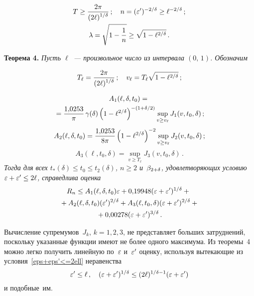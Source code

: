 \begin{multicols}{2}
\noindent
\begin{gather*}
T\ge \displaystyle\frac{\displaystyle 2\pi\mathstrut}{\displaystyle (2\ell)^{1/\delta}\mathstrut}\,;\quad n=(\varepsilon')^{-2/\delta}\ge
\ell^{-2/\delta}\,;\\
\lambda=\sqrt{1-\displaystyle\frac{\displaystyle 1\mathstrut}{\displaystyle n\mathstrut}}\ge\sqrt{1-\ell^{2/\delta}}\,.
\end{gather*}

\smallskip

\noindent
\textbf{Теорема 4.}
\textit{Пусть $\ell$~--- произвольное число из интервала $(0,\,1)$. Обозначим}

\noindent
$$
T_\ell=\displaystyle\frac{\displaystyle 2\pi\mathstrut}{\displaystyle (2\ell)^{1/\delta}\mathstrut}\,;\quad
v_\ell=T_\ell\sqrt{1-\ell^{2/\delta}}\,;
$$

\vspace*{-12pt}

\noindent
\begin{multline*}
A_1(\ell,\delta,t_0)={}\\
{}=
\displaystyle\frac{\displaystyle 1{,}0253\mathstrut}{\displaystyle \pi\mathstrut}\,\gamma(\delta)
\left(1-\ell^{2/\delta}\right)^{-(1+\delta/2)} \sup_{v\ge
v_\ell}J_1(v,t_0,\delta)\,;
\end{multline*}
$$
A_2(\ell,\delta,t_0)=\displaystyle\frac{\displaystyle 1{,}0253\mathstrut}{\displaystyle 8\pi\mathstrut}
\left(1-\ell^{2/\delta}\right)^{-2}\sup_{v\ge v_\ell}J_2(v,t_0,\delta)\,;
$$
$$
A_3(\ell,t_0,\delta)=\sup_{v\ge T_\ell}J_3(v,t_0,\delta)\,.
$$
\textit{Тогда для всех ${t_*(\delta)\le t_0\le t_2(\delta)}$, ${n\ge2}$ и~$\beta_{2+\delta}$,
удовлетворяющих условию ${\varepsilon+\varepsilon'\le 2\ell}$, справедлива
оценка}
\begin{multline*}
\!R_n\le A_1(\ell,\delta,t_0)\varepsilon+ 0{,}19948(\varepsilon+\varepsilon')^{1/\delta}+{}\\
{}+A_2(\ell,\delta,t_0)(\varepsilon')^{2/\delta}+
A_3(\ell,t_0,\delta)(\varepsilon+\varepsilon')^{2/\delta}+{}\\
{}+ 0{,}00278(\varepsilon+\varepsilon')^{3/\delta}\,.
\end{multline*}

\smallskip

Вычисление супремумов~$J_k$, $k=1, 2, 3$, не представляет больших
затруднений, поскольку указанные функции имеют не более одного
максимума. Из теоремы~4 можно легко получить
линейную по~$\varepsilon$ и~$\varepsilon'$ оценку, используя вытекающие из
условия~\eqref{eps+eps'<=2ell} неравенства
$$
\varepsilon'\le\ell\,,\quad
(\varepsilon+\varepsilon')^{1/\delta}\le(2\ell)^{1/\delta-1}(\varepsilon+\varepsilon')
$$
и подобные~им.

\setcounter{table}{8}
\begin{table*}[b]\small
\vspace*{-12pt}
\begin{center}
\parbox{150mm}{

}
\end{center}
\end{table*}
\end{multicols}
